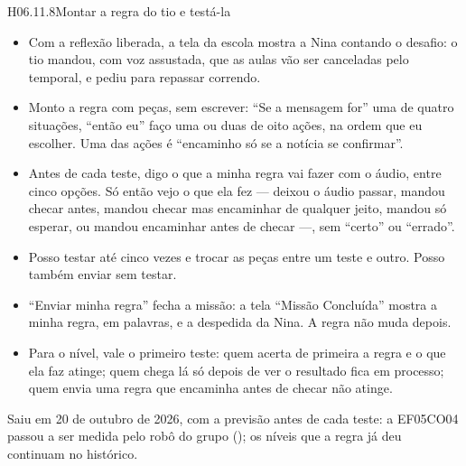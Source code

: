 \begin{historia}{H06.11.8}{Montar a regra do tio e testá-la}{\arquivada}
\aceite
\begin{itemize}
  \item Com a reflexão liberada, a tela da escola mostra a Nina contando o
    desafio: o tio mandou, com voz assustada, que as aulas vão ser canceladas
    pelo temporal, e pediu para repassar correndo.
  \item Monto a regra com peças, sem escrever: \enquote{Se a mensagem for}
    uma de quatro situações, \enquote{então eu} faço uma ou duas de oito ações,
    na ordem que eu escolher. Uma das ações é \enquote{encaminho só se a
    notícia se confirmar}.
  \item Antes de cada teste, digo o que a minha regra vai fazer com o áudio,
    entre cinco opções. Só então vejo o que ela fez --- deixou o áudio passar,
    mandou checar antes, mandou checar mas encaminhar de qualquer jeito,
    mandou só esperar, ou mandou encaminhar antes de checar ---, sem
    \enquote{certo} ou \enquote{errado}.
  \item Posso testar até cinco vezes e trocar as peças entre um teste e
    outro. Posso também enviar sem testar.
  \item \enquote{Enviar minha regra} fecha a missão: a tela \enquote{Missão
    Concluída} mostra a minha regra, em palavras, e a despedida da Nina. A
    regra não muda depois.
  \item Para o nível, vale o primeiro teste: quem acerta de primeira a regra e
    o que ela faz atinge; quem chega lá só depois de ver o resultado fica em
    processo; quem envia uma regra que encaminha antes de checar não atinge.
\end{itemize}
Saiu em 20 de outubro de 2026, com a previsão antes de cada teste: a
EF05CO04 passou a ser medida pelo robô do grupo (); os níveis
que a regra já deu continuam no histórico.
\end{historia}

